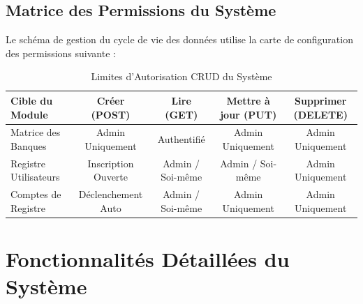 \documentclass[12pt,a4paper]{article}
\begin{document}
	\subsection{Matrice des Permissions du Système}
	Le schéma de gestion du cycle de vie des données utilise la carte de configuration des permissions suivante :
	
	\begin{table}[h!]
		\centering
		\caption{Limites d'Autorisation CRUD du Système}
		\vspace{0.2cm}
		\begin{tabular}{lcccc}
			\toprule
			\textbf{Cible du Module} & \textbf{Créer (POST)} & \textbf{Lire (GET)} & \textbf{Mettre à jour (PUT)} & \textbf{Supprimer (DELETE)} \\
			\midrule
			Matrice des Banques & Admin Uniquement & Authentifié & Admin Uniquement & Admin Uniquement \\
			Registre Utilisateurs & Inscription Ouverte & Admin / Soi-même & Admin / Soi-même & Admin Uniquement \\
			Comptes de Registre & Déclenchement Auto & Admin / Soi-même & Admin Uniquement & Admin Uniquement \\
			\bottomrule
		\end{tabular}
	\end{table}
	
	\newpage
	
	\section{Fonctionnalités Détaillées du Système}
	
\end{document}

